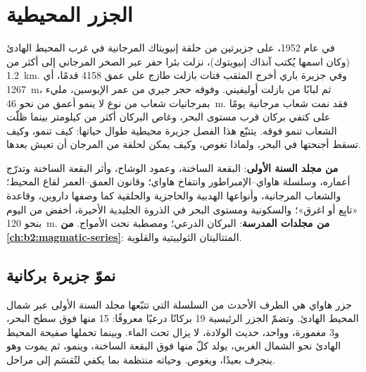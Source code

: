\chapter{الجزر المحيطية}\label{ch:b2:oceanic-islands}

في عام 1952، على جزيرتين من حلقة إنيويتاك المرجانية في غرب المحيط الهادئ (وكان اسمها يُكتب
آنذاك إنيويتوك)، نزلت بئرا حفر عبر الصخر المرجاني إلى أكثر من \qty{1.2}{km}. وفي جزيرة باري
أخرج المثقب فتات بازلت طازج على عمق 4158 قدمًا، أي \qty{1267}{m}، ثم لبابًا من
بازلت أوليفيني. وفوقه حجر جيري من عمر الإيوسين، مليء بمرجانيات شعاب من نوع لا
ينمو أعمق من نحو \qty{46}{m}. فقد نمت شعاب مرجانية يومًا على كتفي بركان قرب مستوى
البحر، وغاص البركان أكثر من كيلومتر بينما ظلّت الشعاب تنمو فوقه. يتتبّع هذا
الفصل جزيرة محيطية طوال حياتها: كيف تنمو، وكيف تسقط أجنحتها في البحر، ولماذا
تغوص، وكيف يمكن لحلقة من المرجان أن تعيش بعدها.

\begin{recall}
\textbf{من مجلد السنة الأولى}: البقعة الساخنة، وعمود الوشاح، وأثر البقعة الساخنة وتدرّج أعماره،
وسلسلة هاواي--الإمبراطور وانتفاخ هاواي؛ وقانون العمق--العمر لقاع المحيط؛ والشعاب المرجانية،
وأنواعها الهدبية والحاجزية والحلقية كما وصفها داروين، وقاعدة «تابِع أو اغرق»؛
والسكونية ومستوى البحر في الذروة الجليدية الأخيرة، أخفض من اليوم بنحو \qty{120}{m}.
\textbf{من مجلدات المدرسة}: البركان الدرعي؛ ومصطبة نحت الأمواج.
\textbf{من \cref{ch:b2:magmatic-series}}: المتتاليتان الثولييتية والقلوية.
\end{recall}

\section{نموّ جزيرة بركانية}\label{sec:b2:oceanic-islands:growth}

جزر هاواي هي الطرف الأحدث من السلسلة التي تتبّعها مجلد السنة الأولى عبر شمال
المحيط الهادئ. وتضمّ الجزر الرئيسية 19 بركانًا درعيًا معروفًا: 15 منها فوق سطح البحر،
و3 مغمورة، وواحد، حديث الولادة، لا يزال تحت الماء. وبينما تحملها صفيحة المحيط الهادئ نحو
الشمال الغربي، يولد كلّ منها فوق البقعة الساخنة، وينمو، ثم يموت وهو ينجرف بعيدًا، ويغوص. وحياته
منتظمة بما يكفي لتُقسَم إلى مراحل.

